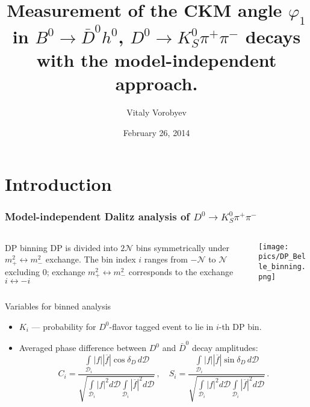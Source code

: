 \documentclass[10 pt,compress,mathserif]{beamer}
\newcommand{\dkspp}{\ensuremath{D^0\to K_S^0\pi^+\pi^-}\xspace}
\newcommand{\bdh}{\ensuremath{B^0\to \bar D^0h^0}\xspace}
\newcommand{\aad}{\ensuremath{|f|}\xspace}
\newcommand{\aadbar}{\ensuremath{|\overline{f}|}\xspace}
\begin{document}
\title{Measurement of the CKM angle $\varphi_1$ in \bdh, \dkspp decays with the model-independent approach.}
\author{Vitaly Vorobyev}
\date{February 26, 2014} 
\frame{\titlepage}

\section{Introduction}
\begin{frame}[containsverbatim]
 \frametitle{Model-independent Dalitz analysis of \dkspp}
 \begin{columns}
  \begin{column}{0.7\textwidth}
   \begin{block}{DP binning}
  DP is divided into $2\mathcal{N}$ bins symmetrically under $m_+^2 \leftrightarrow m_-^2$ exchange. The bin index $i$ ranges from $-\mathcal{N}$ to $\mathcal{N}$ excluding $0$; exchange $m_+^2 \leftrightarrow m_-^2$ corresponds to the exchange $i \leftrightarrow -i$
 \end{block}
  \end{column}
  \begin{column}{0.3\textwidth}
   \texttt{[image: pics/DP\_Belle\_binning.png]}
  \end{column}
 \end{columns}

 \begin{block}{Variables for binned analysis}
 \begin{itemize}
  \item $K_i$ --- probability for $D^0$-flavor tagged event to lie in $i$-th DP bin.
  \item Averaged phase difference between $D^0$ and $\bar D^0$ decay amplitudes:
  \begin{equation*}
  C_i=\frac{\int\limits_{\mathcal{D}_i}
            \aad\aadbar
            \cos\delta_D\,d\mathcal{D}
            }{\sqrt{
            \int\limits_{\mathcal{D}_i}\aad^2 d\mathcal{D}
            \int\limits_{\mathcal{D}_i}\aadbar^2 d\mathcal{D}
            }}\,, \quad
  S_i=\frac{\int\limits_{\mathcal{D}_i}
            \aad\aadbar
            \sin\delta_D\,d\mathcal{D}
            }{\sqrt{
            \int\limits_{\mathcal{D}_i}\aad^2 d\mathcal{D}
            \int\limits_{\mathcal{D}_i}\aadbar^2 d\mathcal{D}
            }}\,.
  \label{cs}
  \end{equation*}
 \end{itemize}


\end{block}
\end{frame}
\end{document}
